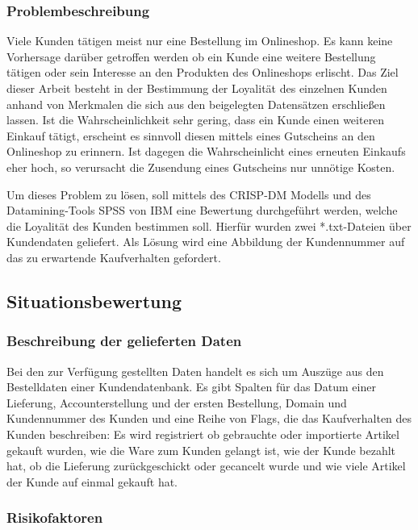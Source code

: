 \documentclass[a4paper,12pt]{article}
\begin{document}
\subsubsection{Problembeschreibung}
Viele Kunden tätigen meist nur eine Bestellung im Onlineshop. Es kann keine Vorhersage darüber getroffen werden ob ein Kunde eine weitere Bestellung tätigen oder sein Interesse an den Produkten des Onlineshops erlischt. Das Ziel dieser Arbeit besteht in der Bestimmung der Loyalität des einzelnen Kunden anhand von Merkmalen die sich aus den beigelegten Datensätzen erschließen lassen. Ist die Wahrscheinlichkeit sehr gering, dass ein Kunde einen weiteren Einkauf tätigt, erscheint es sinnvoll diesen mittels eines Gutscheins an den Onlineshop zu erinnern. Ist dagegen die Wahrscheinlicht eines erneuten Einkaufs eher hoch, so verursacht die Zusendung eines Gutscheins nur unnötige Kosten.  
\par
Um dieses Problem zu lösen, soll mittels des CRISP-DM Modells \cite{crisp}
und des Datamining-Tools SPSS von IBM eine Bewertung durchgeführt werden, welche die
Loyalität des Kunden bestimmen soll. Hierfür wurden zwei *.txt-Dateien über Kundendaten geliefert.
Als Lösung wird eine Abbildung der Kundennummer auf das zu erwartende Kaufverhalten gefordert.  

\subsection{Situationsbewertung}

\subsubsection{Beschreibung der gelieferten Daten}
Bei den zur Verfügung gestellten Daten  handelt es sich um Auszüge aus den Bestelldaten einer Kundendatenbank.
Es gibt Spalten für das Datum einer Lieferung, Accounterstellung und der
ersten Bestellung, Domain und Kundennummer des Kunden und eine Reihe von Flags, die das Kaufverhalten des Kunden beschreiben:
Es wird registriert ob gebrauchte oder importierte Artikel gekauft wurden, wie die Ware zum Kunden gelangt ist, wie der Kunde bezahlt hat, ob die Lieferung zurückgeschickt oder gecancelt wurde und wie viele Artikel der Kunde auf einmal gekauft hat.

\subsubsection{Risikofaktoren}
\end{document}
